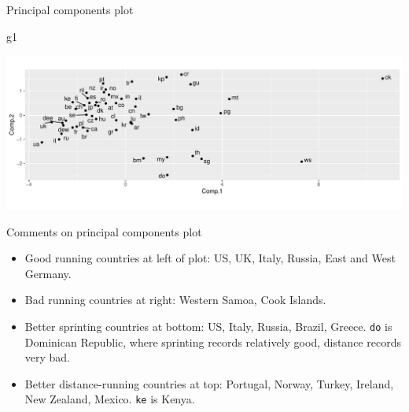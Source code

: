 \documentclass[
  ignorenonframetext,
]{beamer}
\newenvironment{Shaded}{\begin{snugshade}}{\end{snugshade}}
\newcommand{\NormalTok}[1]{#1}
\begin{document}
\begin{frame}[fragile]{Principal components plot}
\protect\hypertarget{principal-components-plot}{}

\begin{Shaded}
\begin{Highlighting}[]
\NormalTok{g1}
\end{Highlighting}
\end{Shaded}

\includegraphics{slides_d29_files/figure-beamer/lecce-1.pdf}

\end{frame}

\begin{frame}[fragile]{Comments on principal components plot}
\protect\hypertarget{comments-on-principal-components-plot}{}

\begin{itemize}
\item
  Good running countries at left of plot: US, UK, Italy, Russia, East
  and West Germany.
\item
  Bad running countries at right: Western Samoa, Cook Islands.
\item
  Better sprinting countries at bottom: US, Italy, Russia, Brazil,
  Greece. \texttt{do} is Dominican Republic, where sprinting records
  relatively good, distance records very bad.
\item
  Better distance-running countries at top: Portugal, Norway, Turkey,
  Ireland, New Zealand, Mexico. \texttt{ke} is Kenya.
\end{itemize}

\end{frame}
\end{document}
